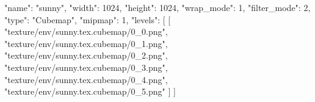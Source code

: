 {
  "name": "sunny",
  "width": 1024,
  "height": 1024,
  "wrap_mode": 1,
  "filter_mode": 2,
  "type": "Cubemap",
  "mipmap": 1,
  "levels": [
    [
      "texture/env/sunny.tex.cubemap/0_0.png",
      "texture/env/sunny.tex.cubemap/0_1.png",
      "texture/env/sunny.tex.cubemap/0_2.png",
      "texture/env/sunny.tex.cubemap/0_3.png",
      "texture/env/sunny.tex.cubemap/0_4.png",
      "texture/env/sunny.tex.cubemap/0_5.png"
    ]
  ]
}
